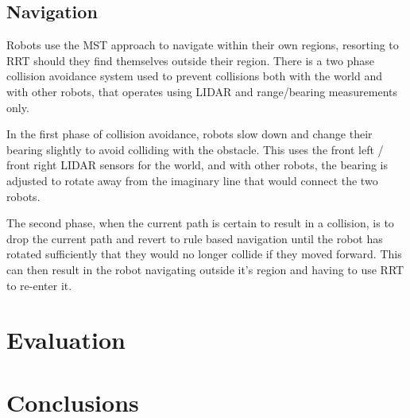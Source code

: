 \documentclass[10pt,a4paper]{article}
\begin{document}
\subsection{Navigation}
Robots use the MST approach to navigate within their own regions, resorting to RRT should they find themselves outside their region. There is a two phase collision avoidance system used to prevent collisions both with the world and with other robots, that operates using LIDAR and range/bearing measurements only.

In the first phase of collision avoidance, robots slow down and change their bearing slightly to avoid colliding with the obstacle. This uses the front left / front right LIDAR sensors for the world, and with other robots, the bearing is adjusted to rotate away from the imaginary line that would connect the two robots.

The second phase, when the current path is certain to result in a collision, is to drop the current path and revert to rule based navigation until the robot has rotated sufficiently that they would no longer collide if they moved forward. This can then result in the robot navigating outside it's region and having to use RRT to re-enter it.

\section{Evaluation}
\section{Conclusions}
\end{document}
